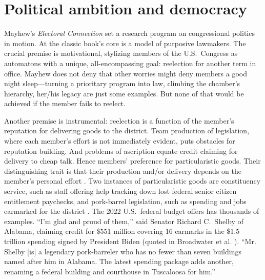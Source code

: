 \documentclass[letter,12pt]{article}
\begin{document}

\section{Political ambition and democracy}

Mayhew's \emph{Electoral Connection} \citeyearpar{mayhew.1974} set a research program on congressional politics in motion. At the classic book's core is a model of purposive lawmakers. The crucial premise is motivational, stylizing members of the U.S.\ Congress as automatons with a unique, all-encompassing goal: reelection for another term in office. Mayhew does not deny that other worries might deny members a good night sleep---turning a prioritary program into law, climbing the chamber's hierarchy, her/his legacy are just some examples. But none of that would be achieved if the member fails to reelect. 

Another premise is instrumental: reelection is a function of the member's reputation for delivering goods to the district. Team production of legislation, where each member's effort is not immediately evident, puts obstacles for reputation building. And problems of ascription equate credit claiming for delivery to cheap talk. Hence members' preference for particularistic goods. Their distinguishing trait is that their production and/or delivery depends on the member's personal effort \citep{haggard.mccubbins.2001}. Two instances of particularistic goods are constituency service, such as staff offering help tracking down lost federal senior citizen entitlement paychecks, and pork-barrel legislation, such as spending and jobs earmarked for the district \citep{cain.etal.1987}. The 2022 U.S.\ federal budget offers has thousands of examples. ``I'm glad and proud of them,'' said Senator Richard C.\ Shelby of Alabama, claiming credit for \$551 million covering 16 earmarks in the \$1.5 trillion spending signed by President Biden (quoted in Broadwater et al. \citeyear{nyt-pork.2022}). ``Mr. Shelby [is] a legendary pork-barreler who has no fewer than seven buildings named after him in Alabama. The latest spending package adds another, renaming a federal building and courthouse in Tuscaloosa for him.'' 
\end{document}
